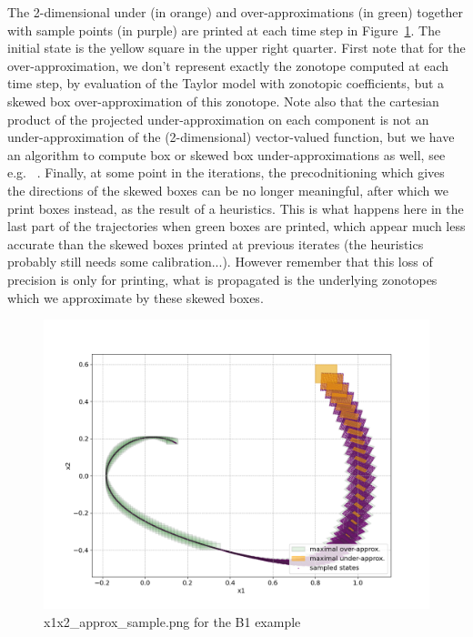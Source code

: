 \documentclass{article}
\begin{document}
The 2-dimensional under (in orange) and over-approximations (in green) together with sample points (in purple) are printed at each time step in Figure~\ref{fig:x1x2_B1}. The initial state is the yellow square in the upper right quarter. First note that for the over-approximation, we don't represent exactly the zonotope  computed at each time step, by evaluation of the Taylor model with zonotopic coefficients, but a skewed box over-approximation of this zonotope.  Note also that the cartesian product of the projected under-approximation on each component is not an under-approximation of the (2-dimensional) vector-valued function, but we have an algorithm to compute box or skewed box under-approximations as well, see e.g. ~\cite{lcss2020,adhs21}. Finally, at some point in the iterations, the precodnitioning which gives the directions of the skewed boxes can be no longer meaningful, after which we print boxes instead, as the result of a heuristics.  This is what happens here in the last part of the trajectories when green boxes are printed, which appear much less accurate than the skewed boxes printed at previous iterates (the heuristics probably still needs some calibration...). However remember that this loss of precision is only for printing, what is propagated is the underlying zonotopes which we approximate by these skewed boxes.  
\begin{figure}[htbp]
\centering
  \includegraphics[width=.99\linewidth]{x1x2_approx_sample_B1sig.png}
\caption{ x1x2\_approx\_sample.png for the B1 example}
\label{fig:x1x2_B1}
\end{figure}
\end{document}
